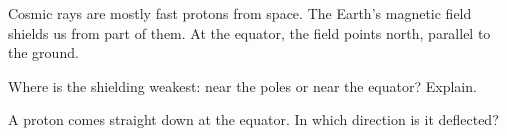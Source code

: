 Cosmic rays are mostly fast protons from space. The Earth's magnetic field shields us from part of them. At the equator, the field points north, parallel to the ground.

\begin{abcliste}
\abc Where is the shielding weakest: near the poles or near the equator? Explain.

\abc A proton comes straight down at the equator. In which direction is it deflected?
\end{abcliste}
